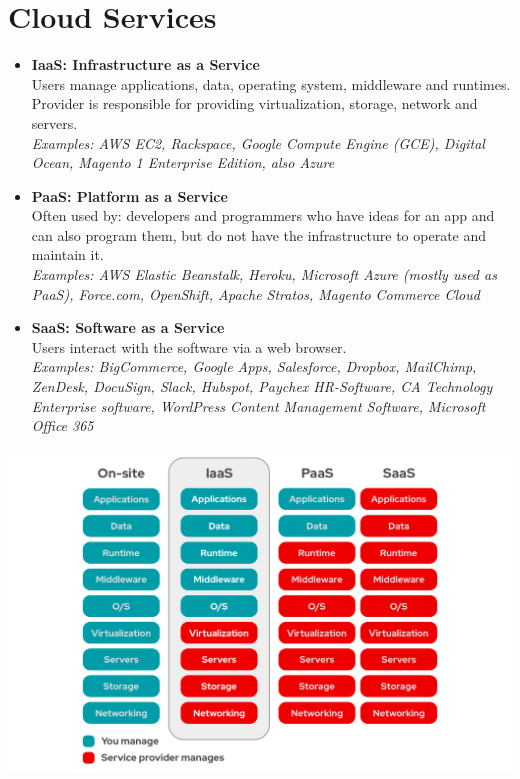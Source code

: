 \documentclass[12pt]{article}
\begin{document}
\thispagestyle{firstpage}

\section*{Cloud Services}
\begin{itemize}
    \item \textbf{IaaS: Infrastructure as a Service} \\
    Users manage applications, data, operating system, middleware and runtimes. \\
    Provider is responsible for providing virtualization, storage, network and servers. \\
    \textit{Examples: AWS EC2, Rackspace, Google Compute Engine (GCE), Digital Ocean, Magento 1 Enterprise Edition, also Azure}
    
    \item \textbf{PaaS: Platform as a Service} \\
    Often used by: developers and programmers who have ideas for an app and can also program them, but do not have the infrastructure to operate and maintain it. \\
    \textit{Examples: AWS Elastic Beanstalk, Heroku, Microsoft Azure (mostly used as PaaS), Force.com, OpenShift, Apache Stratos, Magento Commerce Cloud}
    
    \item \textbf{SaaS: Software as a Service} \\
    Users interact with the software via a web browser. \\
    \textit{Examples: BigCommerce, Google Apps, Salesforce, Dropbox, MailChimp, ZenDesk, DocuSign, Slack, Hubspot, Paychex HR-Software, CA Technology Enterprise software, WordPress Content Management Software, Microsoft Office 365}
\end{itemize}

\includegraphics[scale=0.3]{as-a-Service_comparison.png}
\end{document}
